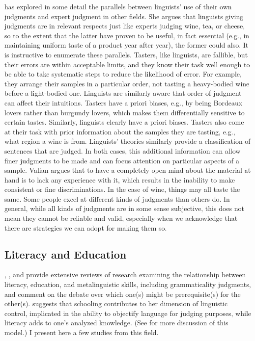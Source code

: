 \largerpage[-1]
\citet{Valian1982} has explored in some detail the parallels between linguists' use of their own judgments and expert judgment in other fields. She argues that linguists giving judgments are in relevant respects just like experts judging wine, tea, or cheese, so to the extent that the latter have proven to be useful, in fact essential (e.g., in maintaining uniform taste of a product year after year), the former could also. It is instructive to enumerate these parallels. Tasters, like linguists, are fallible, but their errors are within acceptable limits, and they know their task well enough to be able to take systematic steps to reduce the likelihood of error. For example, they arrange their samples in a particular order, not tasting a heavy-bodied wine before a light-bodied one. Linguists are similarly aware that order of judgment can affect their intuitions. Tasters have a priori biases, e.g., by being Bordeaux lovers rather than burgundy lovers, which makes them differentially sensitive to certain tastes. Similarly, linguists clearly have a priori biases. Tasters also come at their task with prior information about the samples they are tasting, e.g., what region a wine is from. Linguists' theories similarly provide a classification of sentences that are judged. In both cases, this additional information can allow finer judgments to be made and can focus attention on particular aspects of a sample. Valian argues that to have a completely open mind about the material at hand is to lack any experience with it, which results in the inability to
make consistent or fine discriminations. In the case of wine, things may all taste the same. Some people excel at different kinds of judgments than others do. In general, while all kinds of judgments are in some sense subjective, this does not mean they cannot be reliable and valid, especially when we acknowledge that there are strategies we can adopt for making them so.

\subsection{Literacy and Education}\label{sec:4.4.2}

\citet[31\textendash{}44]{Birdsong1989}, \citet{BialystokEtAl1985}, and \citet{MasnyEtAl1985} provide extensive reviews of research examining the relationship between literacy, education, and metalinguistic skills, including grammaticality judgments, and comment on the debate over which one(s) might be prerequisite(s) for the other(s). \citet{Bialystok1986} suggests that schooling contributes to her dimension of linguistic control, implicated in the ability to objectify language for judging purposes, while literacy adds to one's analyzed knowledge. (See  for more discussion of this model.) I present here a few studies from this field.

